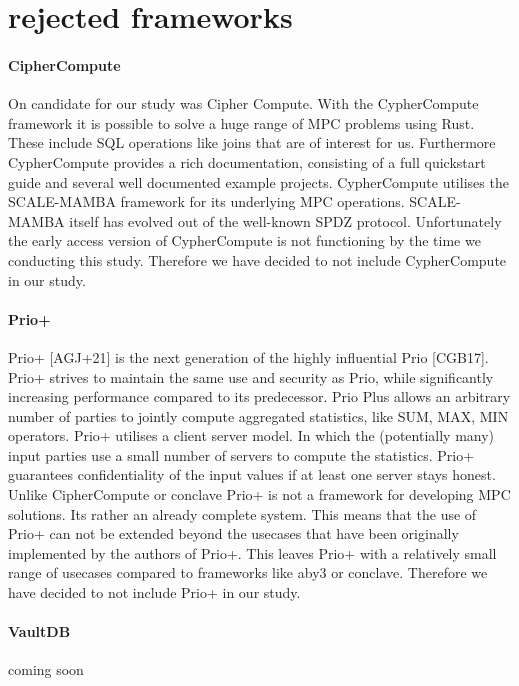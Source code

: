 \section{rejected frameworks}
\paragraph{CipherCompute}
On candidate for our study was Cipher Compute. With the CypherCompute framework it is possible to solve a huge range of MPC problems using Rust. These include SQL operations like joins that are of interest for us. Furthermore CypherCompute provides a rich documentation, consisting of a full quickstart guide and several well documented example projects. CypherCompute utilises the SCALE-MAMBA framework for its underlying MPC operations. SCALE-MAMBA itself has evolved out of the well-known SPDZ protocol. Unfortunately the early access version of CypherCompute is not functioning by the time we conducting this study. Therefore we have decided to not include CypherCompute in our study.

\paragraph{Prio+}
Prio+ [AGJ+21] is the next generation of the highly influential Prio [CGB17]. Prio+ strives to maintain the same use and security as Prio, while significantly increasing performance compared to its predecessor. Prio Plus allows an arbitrary number of parties to jointly compute aggregated statistics, like SUM, MAX, MIN operators. Prio+ utilises a client server model. In which the (potentially many) input parties use a small number of servers to compute the statistics.
Prio+ guarantees confidentiality of the input values if at least one server stays honest. Unlike CipherCompute or conclave Prio+ is not a framework for developing MPC solutions. Its rather an already complete system. This means that the use of Prio+ can not be extended beyond the usecases that have been originally implemented by the authors of Prio+. This leaves Prio+ with a relatively small range of usecases compared to frameworks like aby3 or conclave. Therefore we have decided to not include Prio+ in our study.

\paragraph{VaultDB}
coming soon
